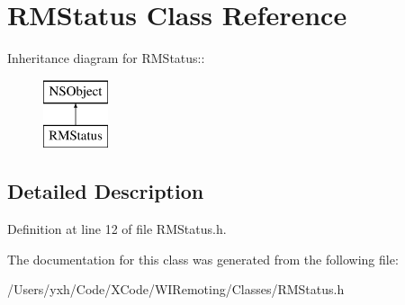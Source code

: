 \hypertarget{interface_r_m_status}{
\section{RMStatus Class Reference}
\label{interface_r_m_status}
}
Inheritance diagram for RMStatus::\begin{figure}[H]
\begin{center}
\leavevmode
\includegraphics[height=2cm]{interface_r_m_status}
\end{center}
\end{figure}


\subsection{Detailed Description}


Definition at line 12 of file RMStatus.h.

The documentation for this class was generated from the following file:\begin{DoxyCompactItemize}
\item 
/Users/yxh/Code/XCode/WIRemoting/Classes/RMStatus.h\end{DoxyCompactItemize}
